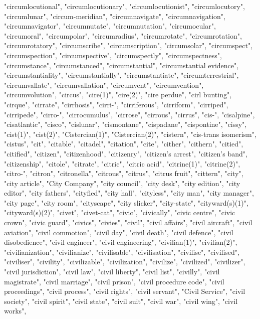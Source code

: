 "circumlocutional",
"circumlocutionary",
"circumlocutionist",
"circumlocutory",
"circumlunar",
"circum-meridian",
"circumnavigate",
"circumnavigation",
"circumnavigator",
"circumnutate",
"circumnutation",
"circumocular",
"circumoral",
"circumpolar",
"circumradius",
"circumrotate",
"circumrotation",
"circumrotatory",
"circumscribe",
"circumscription",
"circumsolar",
"circumspect",
"circumspection",
"circumspective",
"circumspectly",
"circumspectness",
"circumstance",
"circumstanced",
"circumstantial",
"circumstantial evidence",
"circumstantiality",
"circumstantially",
"circumstantiate",
"circumterrestrial",
"circumvallate",
"circumvallation",
"circumvent",
"circumvention",
"circumvolution",
"circus",
"cire(1)",
"cire(2)",
"cire perdue",
"cirl bunting",
"cirque",
"cirrate",
"cirrhosis",
"cirri-",
"cirriferous",
"cirriform",
"cirriped",
"cirripede",
"cirro-",
"cirrocumulus",
"cirrose",
"cirrous",
"cirrus",
"cis-",
"cisalpine",
"cisatlantic",
"cisco",
"cislunar",
"cismontane",
"cispadane",
"cispontine",
"cissy",
"cist(1)",
"cist(2)",
"Cistercian(1)",
"Cistercian(2)",
"cistern",
"cis-trans isomerism",
"cistus",
"cit",
"citable",
"citadel",
"citation",
"cite",
"cither",
"cithern",
"citied",
"citified",
"citizen",
"citizenhood",
"citizenry",
"citizen's arrest",
"citizen's band",
"citizenship",
"citole",
"citrate",
"citric",
"citric acid",
"citrine(1)",
"citrine(2)",
"citro-",
"citron",
"citronella",
"citrous",
"citrus",
"citrus fruit",
"cittern",
"city",
"city article",
"City Company",
"city council",
"city desk",
"city edition",
"city editor",
"city fathers",
"cityfied",
"city hall",
"cityless",
"city man",
"city manager",
"city page",
"city room",
"cityscape",
"city slicker",
"city-state",
"cityward(s)(1)",
"cityward(s)(2)",
"civet",
"civet-cat",
"civic",
"civically",
"civic centre",
"civic crown",
"civic guard",
"civics",
"civies",
"civil",
"civil affairs",
"civil aircraft",
"civil aviation",
"civil commotion",
"civil day",
"civil death",
"civil defence",
"civil disobedience",
"civil engineer",
"civil engineering",
"civilian(1)",
"civilian(2)",
"civilianization",
"civilianize",
"civilisable",
"civilisation",
"civilise",
"civilised",
"civiliser",
"civility",
"civilizable",
"civilization",
"civilize",
"civilized",
"civilizer",
"civil jurisdiction",
"civil law",
"civil liberty",
"civil list",
"civilly",
"civil magistrate",
"civil marriage",
"civil prison",
"civil procedure code",
"civil proceedings",
"civil process",
"civil rights",
"civil servant",
"Civil Service",
"civil society",
"civil spirit",
"civil state",
"civil suit",
"civil war",
"civil wing",
"civil works",
